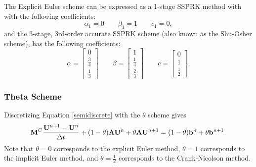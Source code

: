 The Explicit Euler scheme can be expressed as a 1-stage SSPRK method with
with the following coefficients:
\begin{equation}
   \alpha_1 = 0\qquad\beta_1 = 1\qquad c_1 = 0,
\end{equation}
and the 3-stage, 3rd-order accurate SSPRK scheme (also known as the Shu-Osher
scheme), has the following coefficients:
\begin{equation}
   \alpha = \left[\begin{array}{c}0\\\frac{3}{4}\\\frac{1}{3}\end{array}\right]
   \qquad\beta = \left[\begin{array}{c}1\\\frac{1}{4}\\\frac{2}{3}\end{array}\right]
   \qquad c = \left[\begin{array}{c}0\\1\\\frac{1}{2}\end{array}\right].
\end{equation}
\subsubsection{Theta Scheme}\label{theta}
Discretizing Equation \eqref{semidiscrete} with the $\theta$ scheme gives
\begin{equation}\label{galerkin_theta}
  \mathbf{M}^C\frac{\mathbf{U}^{n+1}-\mathbf{U}^n}{\Delta t}
  + (1-\theta)\mathbf{A}\mathbf{U}^n + \theta\mathbf{A}\mathbf{U}^{n+1}
  = (1-\theta)\mathbf{b}^n + \theta\mathbf{b}^{n+1}.
\end{equation}
Note that $\theta=0$ corresponds to the explicit Euler method,
$\theta=1$ corresponds to the implicit Euler method, and $\theta=\frac{1}{2}$
corresponds to the Crank-Nicolson method.

